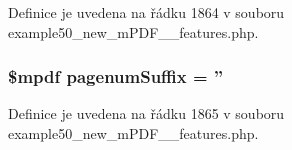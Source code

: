 Definice je uvedena na řádku 1864 v souboru example50\-\_\-new\-\_\-m\-P\-D\-F\-\_\-\_\-features.\-php.

\hypertarget{example50__new__m_p_d_f__3__features_8php_a31f34f9e336bf5b112faf453c718050e}{
\subsubsection[{pagenum\-Suffix}]{\setlength{\rightskip}{0pt plus 5cm}\$mpdf pagenum\-Suffix = ''}}\label{example50__new__m_p_d_f__3__features_8php_a31f34f9e336bf5b112faf453c718050e}


Definice je uvedena na řádku 1865 v souboru example50\-\_\-new\-\_\-m\-P\-D\-F\-\_\-\_\-features.\-php.


